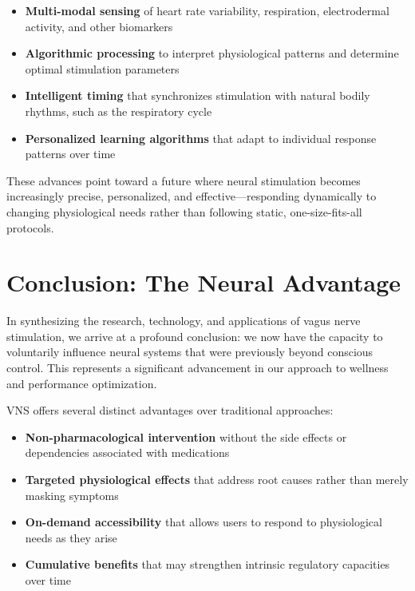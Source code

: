 \documentclass[
  Letterpaper,
]{scrbook}
\providecommand{\tightlist}{%
  \setlength{\itemsep}{0pt}\setlength{\parskip}{0pt}}\usepackage{longtable,booktabs,array}
\begin{document}
\begin{itemize}
\tightlist
\item
  \textbf{Multi-modal sensing} of heart rate variability, respiration,
  electrodermal activity, and other biomarkers
\item
  \textbf{Algorithmic processing} to interpret physiological patterns
  and determine optimal stimulation parameters
\item
  \textbf{Intelligent timing} that synchronizes stimulation with natural
  bodily rhythms, such as the respiratory cycle
\item
  \textbf{Personalized learning algorithms} that adapt to individual
  response patterns over time
\end{itemize}

These advances point toward a future where neural stimulation becomes
increasingly precise, personalized, and effective---responding
dynamically to changing physiological needs rather than following
static, one-size-fits-all protocols.

\section{Conclusion: The Neural
Advantage}\label{conclusion-the-neural-advantage}

In synthesizing the research, technology, and applications of vagus
nerve stimulation, we arrive at a profound conclusion: we now have the
capacity to voluntarily influence neural systems that were previously
beyond conscious control. This represents a significant advancement in
our approach to wellness and performance optimization.

VNS offers several distinct advantages over traditional approaches:

\begin{itemize}
\tightlist
\item
  \textbf{Non-pharmacological intervention} without the side effects or
  dependencies associated with medications
\item
  \textbf{Targeted physiological effects} that address root causes
  rather than merely masking symptoms
\item
  \textbf{On-demand accessibility} that allows users to respond to
  physiological needs as they arise
\item
  \textbf{Cumulative benefits} that may strengthen intrinsic regulatory
  capacities over time
\end{itemize}
\end{document}
